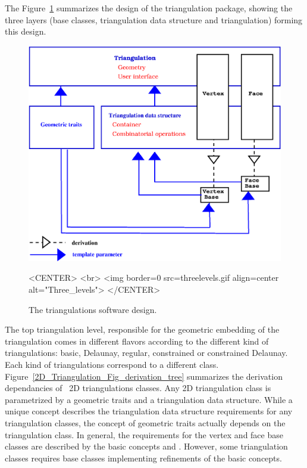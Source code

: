 The Figure~\ref{2D_Triangulation_Fig_three_levels} summarizes the design of the
triangulation package, showing the  three layers
(base classes, triangulation data structure and triangulation)
forming this design.

\begin{figure}
\begin{ccTexOnly}
\begin{center}
\includegraphics[width=13cm]{threelevels.eps}
\end{center}
\end{ccTexOnly}
\caption{The triangulations software design.
\label{2D_Triangulation_Fig_three_levels}}
\begin{ccHtmlOnly}
<CENTER>
<br>
<img border=0 src=threelevels.gif align=center alt="Three_levels">
</CENTER>
\end{ccHtmlOnly}
\end{figure}

The top triangulation  level, responsible for the geometric 
embedding of the  triangulation comes in different flavors 
according to the different kind of triangulations:
basic, Delaunay, regular, constrained or constrained Delaunay.
Each kind of triangulations correspond to a different
class. 
Figure~\ref{2D_Triangulation_Fig_derivation_tree}  summarizes the derivation dependancies
of \cgal\ 2D triangulations classes.
Any 2D triangulation class is parametrized by
a geometric traits and a triangulation data structure.
While a  unique concept 
describes the   triangulation data structure requirements
for any  triangulation classes, 
the concept of geometric traits actually depends
on the  triangulation class.
In general, the requirements for the vertex and face base classes 
are described by the basic concepts 
and  . However, some  triangulation
classes requires base classes implementing
refinements 
of the basic concepts.


